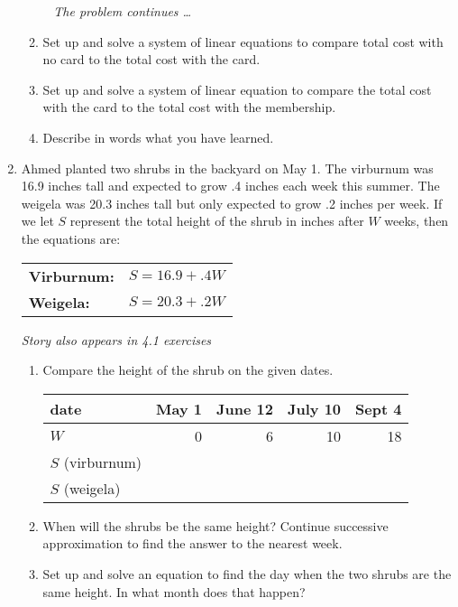 \begin{enumerate}
\begin{enumerate}
\newpage %
~\hspace{-.5in} \emph{The problem continues \ldots}

\item Set up and solve a system of linear equations to compare total cost with no card to the total cost with the card. \vfill \vfill
\item Set up and solve a system of linear equation to compare the total cost with the card to the total cost with the membership. \vfill \vfill
\item Describe in words what you have learned. \vfill
\end{enumerate}

\newpage %

\item Ahmed planted two shrubs in the backyard on May 1.  The virburnum was 16.9 inches tall and expected to grow .4 inches each week this summer.  The weigela was 20.3 inches tall but only expected to grow .2 inches per week.  If we let $S$ represent the total height of the shrub in inches after $W$ weeks, then the equations are:
\begin{center}
\begin{tabular} {ll} 
\textbf{Virburnum:} &$S=16.9+.4W$ \\
\textbf{Weigela:} & $S=20.3+.2W$ \\
\end{tabular}
\end{center}

 \hfill \emph{Story also appears in 4.1 exercises}
\begin{enumerate}
\item Compare the height of the shrub on the given dates.
\begin{center}
\begin{tabular} {|l|r|r|r|r|} \hline
date & May 1 & June 12 & July 10 & Sept 4 \\ \hline
$W$ & 0 & 6 & 10 & 18 \\ \hline
$S$ (virburnum) & &&&  \\ \hline
$S$ (weigela) & &&&\\ \hline
\end{tabular}
\end{center}
\item When will the shrubs be the same height?  Continue successive approximation to find the answer to the nearest week. \vfill
\item Set up and solve an equation to find the day when the two shrubs are the same height. In what month does that happen? \vfill
\end{enumerate}


\end{enumerate}
